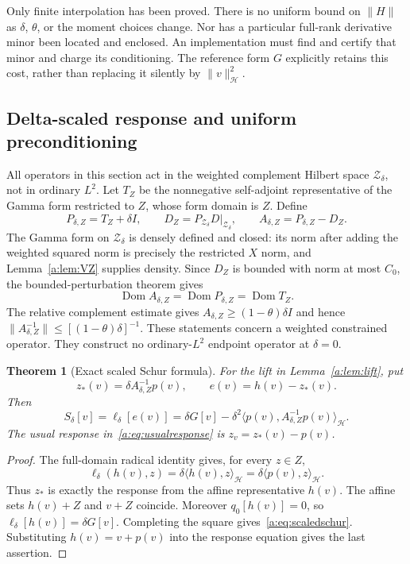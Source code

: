 \documentclass[11pt,a4paper]{article}
\numberwithin{equation}{section}
\newtheorem{theorem}{Theorem}[section]
\theoremstyle{definition}\newtheorem{definition}[theorem]{Definition}
\theoremstyle{remark}\newtheorem{remark}[theorem]{Remark}
\newcommand{\Hh}{\mathcal H}\newcommand{\Hw}{\mathcal H}
\newcommand{\dom}{\operatorname{Dom}}\newcommand{\Var}{\operatorname{Var}}
\newcommand{\ip}[2]{\langle#1,#2\rangle}\newcommand{\norm}[1]{\lVert#1\rVert}\newcommand{\abs}[1]{\lvert#1\rvert}
\newcommand{\Zc}{\mathcal Z_\delta}\newcommand{\Rcal}{\mathcal R}
\begin{document}
Only finite interpolation has been proved. There is no uniform bound on $\norm H$ as $\delta$, $\theta$, or the moment choices change. Nor has a particular full-rank derivative minor been located and enclosed. An implementation must find and certify that minor and charge its conditioning. The reference form $G$ explicitly retains this cost, rather than replacing it silently by $\norm v_{\Hh}^2$.

\subsection{Delta-scaled response and uniform preconditioning}\label{a:sec:response}

All operators in this section act in the weighted complement Hilbert space $\Zc$, not in ordinary $L^2$. Let $T_Z$ be the nonnegative self-adjoint representative of the Gamma form restricted to $Z$, whose form domain is $Z$. Define
\begin{equation}\label{a:eq:weightedops}
 P_{\delta,Z}=T_Z+\delta I,\qquad
 D_Z=P_{\Zc}D|_{\Zc},\qquad
 A_{\delta,Z}=P_{\delta,Z}-D_Z.
\end{equation}
The Gamma form on $\Zc$ is densely defined and closed: its norm after adding the weighted squared norm is precisely the restricted $X$ norm, and Lemma~\ref{a:lem:VZ} supplies density. Since $D_Z$ is bounded with norm at most $C_0$, the bounded-perturbation theorem gives
\begin{equation}\label{a:eq:opdomains}
 \dom A_{\delta,Z}=\dom P_{\delta,Z}=\dom T_Z.
\end{equation}
The relative complement estimate gives
$A_{\delta,Z}\ge(1-\theta)\delta I$ and hence
$\norm{A_{\delta,Z}^{-1}}\le[(1-\theta)\delta]^{-1}$.
These statements concern a weighted constrained operator. They construct no ordinary-$L^2$ endpoint operator at $\delta=0$.

\begin{theorem}[Exact scaled Schur formula]\label{a:thm:scaled}
For the lift in Lemma~\ref{a:lem:lift}, put
\begin{equation}\label{a:eq:liftresponse}
 z_*(v)=\delta A_{\delta,Z}^{-1}p(v),\qquad
 e(v)=h(v)-z_*(v).
\end{equation}
Then
\begin{equation}\label{a:eq:scaledschur}
 S_\delta[v]=\ell_\delta[e(v)]
 =\delta G[v]-\delta^2\ip{p(v)}{A_{\delta,Z}^{-1}p(v)}_{\Hh}.
\end{equation}
The usual response in~\eqref{a:eq:usualresponse} is $z_v=z_*(v)-p(v)$.
\end{theorem}
\begin{proof}
The full-domain radical identity gives, for every $z\in Z$,
\[
 \ell_\delta(h(v),z)=\delta\ip{h(v)}z_{\Hh}
                    =\delta\ip{p(v)}z_{\Hh}.
\]
Thus $z_*$ is exactly the response from the affine representative $h(v)$. The affine sets $h(v)+Z$ and $v+Z$ coincide. Moreover $q_0[h(v)]=0$, so $\ell_\delta[h(v)]=\delta G[v]$. Completing the square gives~\eqref{a:eq:scaledschur}. Substituting $h(v)=v+p(v)$ into the response equation gives the last assertion.
\end{proof}
\end{document}
